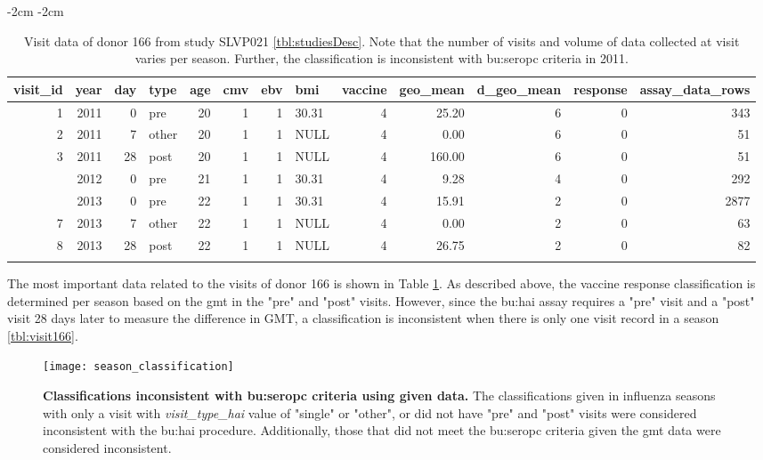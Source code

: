 \begin{table}[htpb]
\addtolength{\leftskip} {-2cm} %
\addtolength{\rightskip} {-2cm} %
\begin{tabular}{rrrlrrrlrrrrr}
\toprule{}
visit\_id & year & day & type & age & cmv & ebv & bmi & vaccine & geo\_mean & d\_geo\_mean & response & assay\_data\_rows\\
\midrule{}
1 & 2011 & 0 & pre & 20 & 1 & 1 & 30.31 & 4 & 25.20 & 6 & 0 & 343\\
2 & 2011 & 7 & other & 20 & 1 & 1 & NULL & 4 & 0.00 & 6 & 0 & 51\\
3 & 2011 & 28 & post & 20 & 1 & 1 & NULL & 4 & 160.00 & 6 & 0 & 51\\
\addlinespace
4 & 2012 & 0 & pre & 21 & 1 & 1 & 30.31 & 4 & 9.28 & 4 & 0 & 292\\
\addlinespace
6 & 2013 & 0 & pre & 22 & 1 & 1 & 30.31 & 4 & 15.91 & 2 & 0 & 2877\\
7 & 2013 & 7 & other & 22 & 1 & 1 & NULL & 4 & 0.00 & 2 & 0 & 63\\
8 & 2013 & 28 & post & 22 & 1 & 1 & NULL & 4 & 26.75 & 2 & 0 & 82\\
\bottomrule{}
\end{tabular}
\caption{
    Visit data of donor 166 from study SLVP021 \autoref{tbl:studiesDesc}.
    Note that the number of visits and volume of data collected at visit varies per season.
    Further, the classification is inconsistent with \gls{bu:seropc} criteria in 2011.}\label{tbl:visit166}
\end{table}

The most important data related to the visits of donor 166 is shown in Table \ref{tbl:visit166}.
As described above, the vaccine response classification is determined per season based on the \acrshort{gmt} in the "pre" and "post" visits.
However, since the \gls{bu:hai} assay requires a "pre" visit and a "post" visit 28 days later to measure the difference in GMT, a classification is inconsistent when there is only one visit record in a season \autoref{tbl:visit166}.

\begin{figure}[htpb]
    \texttt{[image: season\_classification]}
    \caption{
        \textbf{Classifications inconsistent with \gls{bu:seropc} criteria using given data.}
        The classifications given in influenza seasons with only a visit with \textit{visit\_type\_hai} value of "single" or "other", or did not have "pre" and "post" visits were considered inconsistent with the \gls{bu:hai} procedure.
        Additionally, those that did not meet the \gls{bu:seropc} criteria given the \acrshort{gmt} data were considered inconsistent.
    }\label{fig:classInconsistent}
\end{figure}

